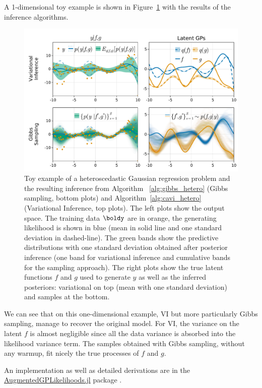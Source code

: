 A 1-dimensional toy example is shown in Figure~\ref{fig:heteroscedastic} with the results of the inference algorithms.

\begin{figure}[H]
\includegraphics[width=\textwidth]{./chapters/8_discussions/figures/heteroscedastic.pdf}
\caption{Toy example of a heteroscedastic Gaussian regression problem and the resulting inference from Algorithm ~\ref{alg:gibbs_hetero} (Gibbs sampling, bottom plots) and Algorithm~\ref{alg:cavi_hetero} (Variational Inference, top plots).
The left plots show the output space.
The training data $\boldy$ are in orange, the generating likelihood is shown in blue (mean in solid line and one standard deviation in dashed-line).
The green bands show the predictive distributions with one standard deviation obtained after posterior inference (one band for variational inference and cumulative bands for the sampling approach).
The right plots show the true latent functions $f$ and $g$ used to generate $y$ as well as the inferred posteriors: variational on top (mean with one standard deviation) and samples at the bottom.}
\label{fig:heteroscedastic}
\end{figure}

We can see that on this one-dimensional example, \ac{VI} but more particularly Gibbs sampling, manage to recover the original model.
For \ac{VI}, the variance on the latent $f$ is almost negligible since all the data variance is absorbed into the likelihood variance term.
The samples obtained with Gibbs sampling, without any warmup, fit nicely the true processes of $f$ and $g$.

An implementation as well as detailed derivations are in the \href{https://github.com/JuliaGaussianProcesses/AugmentedGPLikelihoods.jl}{AugmentedGPLikelihoods.jl} package \cite{theo_galy_fajou_2022_6347022}.


